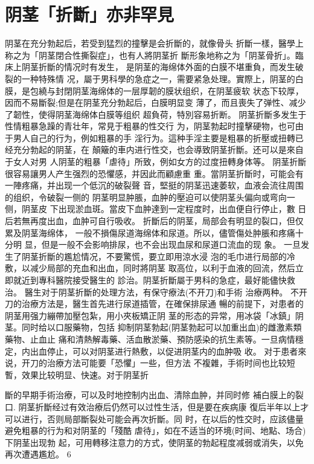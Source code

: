 \documentclass[12pt,UTF8]{ctexbook}
\begin{document}
\section{阴茎「折斷」亦非罕見}
阴茎在充分勃起后，若受到猛烈的撞擊是会折斷的，就像骨头
折斷一樣，醫學上称之为「阴茎閉合性撕裂症」，也有人將阴茎折
斷形象地称之为「阴茎骨折」。臨床上阴茎折斷的情况时有发生，
是阴茎的海绵体外面的白膜不堪重負，而发生破裂的一种特殊情
况，屬于男科學的急症之一，需要紧急处理。實際上，阴茎的白
膜，是包繞与封閉阴茎海绵体的一层厚韌的膜状组织，在阴茎疲软
状态下较厚，因而不易斷裂;但是在阴茎充分勃起后，白膜明显变
薄了，而且喪失了弹性、减少了韌性，使得阴茎海绵体白膜等组织
超負荷，特別容易折断。
阴茎折斷多发生于性情粗暴急躁的青壮年，常見于粗暴的性交行
为，阴茎勃起时撞擊硬物，也可由于男人自己的行为，例如粗暴的手
淫行为。這种手淫主要是粗暴的折壓或扭轉已经充分勃起的阴茎，在
顛簸的車内进行性交，也会導致阴茎折斷。还可以是來自于女人对男
人阴茎的粗暴「虐待」所致，例如女方的过度扭轉身体等。
阴茎折斷很容易讓男人产生强烈的恐懼感，并因此而顧慮重
重。當阴茎折斷时，可能会有一陣疼痛，并出现一个低沉的破裂聲
音，堅挺的阴茎迅速萎软，血液会流往周围的组织，令破裂一侧的
阴茎明显肿脹，血肿的壓迫可以使阴茎头偏向或弯向一侧，阴茎皮
下出现淤血斑。當皮下血肿達到一定程度时，出血便自行停止，數
日后若無再度出血，血肿可自行吸收。
折斷后的阴茎，局部会有明显的裂口，但仅累及阴茎海绵体，
一般不損傷尿道海绵体和尿道。所以，儘管傷处肿脹和疼痛十分明
显，但是一般不会影响排尿，也不会出现血尿和尿道口流血的现
象。
一旦发生了阴茎折斷的尷尬情况，不要驚慌，要立即用涼水浸
泡的毛巾进行局部的冷敷，以减少局部的充血和出血，同时將阴茎
取高位，以利于血液的回流，然后立即就近到專科醫院接受醫生的
診治。阴茎折斷屬于男科的急症，最好能儘快救治。
醫生对于阴茎折斷的处理方法，有保守療法(不开刀)和手術
治療两种。
不开刀的治療方法是，醫生首先进行尿道插管，在確保排尿通
暢的前提下，对患者的阴茎用强力繃帶加壓包紮，用小夾板矯正阴
茎的形态的异常，用冰袋「冰鎮」阴茎。同时给以口服藥物，包括
抑制阴茎勃起(阴茎勃起可以加重出血)的雌激素類藥物、止血止
痛和清熱解毒藥、活血散淤藥、預防感染的抗生素等。一旦病情穩
定，内出血停止，可以对阴茎进行熱敷，以促进阴茎内的血肿吸
收。
对于患者來说，开刀的治療方法可能要「恐懼」一些，但方法
不複雜，手術时间也比较短暫，效果比较明显、快速。对于阴茎折

斷的早期手術治療，可以及时地控制内出血、清除血肿，并同时修
補白膜上的裂口.
阴茎折斷经过有效治療后仍然可以过性生活，但是要在疾病康
復后半年以上才可以进行，否则局部斷裂处可能会再次折斷。同
时，在以后的性交时，应該儘量避免粗暴的行为和对阴茎的「殘酷
虐待」，如在不适当的环境(时间、地點、场合)下阴茎出现勃
起，可用轉移注意力的方式，使阴茎的勃起程度减弱或消失，以免
再次遭遇尷尬。
6
\end{document}
